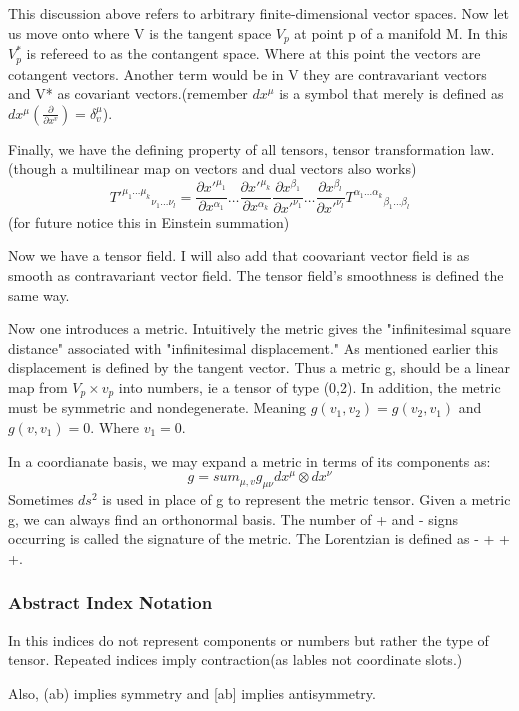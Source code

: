   This discussion above refers to arbitrary finite-dimensional vector spaces. Now let us move onto where V is the tangent space $V_p$ at point p of a manifold M. In this $V_p^*$ is refereed to as the contangent space. Where at this point the vectors are cotangent vectors. Another term would be in V they are contravariant vectors and V* as covariant vectors.(remember $dx^\mu$ is a symbol that merely is defined as $dx^\mu(\frac{\partial}{\partial x^v})=\delta^\mu_v$).

Finally, we have the defining property of all tensors, tensor transformation law.(though a multilinear map on vectors and dual vectors also works)
\[
T'^{\mu_1 \dots \mu_k}{}_{\nu_1 \dots \nu_l}
=
\frac{\partial x'^{\mu_1}}{\partial x^{\alpha_1}}
\dots
\frac{\partial x'^{\mu_k}}{\partial x^{\alpha_k}}
\frac{\partial x^{\beta_1}}{\partial x'^{\nu_1}}
\dots
\frac{\partial x^{\beta_l}}{\partial x'^{\nu_l}}
T^{\alpha_1 \dots \alpha_k}{}_{\beta_1 \dots \beta_l}
  \]
(for future notice this in Einstein summation)

Now we have a tensor field. I will also add that coovariant vector field is as smooth as contravariant vector field. The tensor field's smoothness is defined the same way.

Now one introduces a metric. Intuitively the metric gives the "infinitesimal square distance" associated with "infinitesimal displacement." As mentioned earlier this displacement is defined by the tangent vector. Thus a metric g, should be a linear map from $V_p \times v_p$ into numbers, ie a tensor of type (0,2). In addition, the metric must be symmetric and nondegenerate. Meaning $g(v_1,v_2)= g(v_2,v_1)$ and $g(v,v_1)=0$. Where $v_1 = 0$.

In a coordianate basis, we may expand a metric in terms of its components as:
\[
g= sum_{\mu,v} g_{\mu \nu} dx^\mu \otimes dx^{\nu}
  \]
  Sometimes $ds^2$ is used in place of g to represent the metric tensor. Given a metric g, we can always find an orthonormal basis. The number of + and - signs occurring is called the signature of the metric. The Lorentzian is defined as - + + +.

\subsubsection{Abstract Index Notation}
In this indices do not represent components or numbers but rather the type of tensor. Repeated indices imply contraction(as lables not coordinate slots.)

Also, (ab) implies symmetry and [ab] implies antisymmetry.

